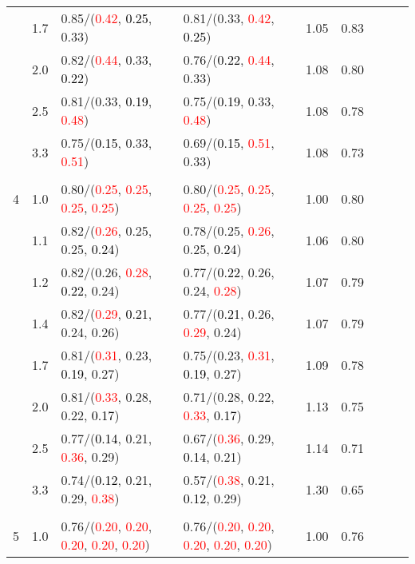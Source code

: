 \documentclass[10pt,a4paper]{report}
\begin{document}
\begin{table}[!htbp]
\begin{center}
{\begin{tabular}{ccllccccc}
			&1.7&0.85/(\textcolor{red}{0.42}, \textcolor{black}{0.25}, 0.33)&0.81/(0.33, \textcolor{red}{0.42}, \textcolor{black}{0.25})&1.05&0.83\\
			&2.0&0.82/(\textcolor{red}{0.44}, 0.33, \textcolor{black}{0.22})&0.76/(\textcolor{black}{0.22}, \textcolor{red}{0.44}, 0.33)&1.08&0.80\\
			&2.5&0.81/(0.33, \textcolor{black}{0.19}, \textcolor{red}{0.48})&0.75/(\textcolor{black}{0.19}, 0.33, \textcolor{red}{0.48})&1.08&0.78\\
			&3.3&0.75/(\textcolor{black}{0.15}, 0.33, \textcolor{red}{0.51})&0.69/(\textcolor{black}{0.15}, \textcolor{red}{0.51}, 0.33)&1.08&0.73\\
			&&&&\\
			4			&1.0&0.80/(\textcolor{red}{0.25}, \textcolor{red}{0.25}, \textcolor{red}{0.25}, \textcolor{red}{0.25})&0.80/(\textcolor{red}{0.25}, \textcolor{red}{0.25}, \textcolor{red}{0.25}, \textcolor{red}{0.25})&1.00&0.80\\
			&1.1&0.82/(\textcolor{red}{0.26}, 0.25, 0.25, \textcolor{black}{0.24})&0.78/(0.25, \textcolor{red}{0.26}, 0.25, \textcolor{black}{0.24})&1.06&0.80\\
			&1.2&0.82/(0.26, \textcolor{red}{0.28}, \textcolor{black}{0.22}, 0.24)&0.77/(\textcolor{black}{0.22}, 0.26, 0.24, \textcolor{red}{0.28})&1.07&0.79\\
			&1.4&0.82/(\textcolor{red}{0.29}, \textcolor{black}{0.21}, 0.24, 0.26)&0.77/(\textcolor{black}{0.21}, 0.26, \textcolor{red}{0.29}, 0.24)&1.07&0.79\\
			&1.7&0.81/(\textcolor{red}{0.31}, 0.23, \textcolor{black}{0.19}, 0.27)&0.75/(0.23, \textcolor{red}{0.31}, \textcolor{black}{0.19}, 0.27)&1.09&0.78\\
			&2.0&0.81/(\textcolor{red}{0.33}, 0.28, 0.22, \textcolor{black}{0.17})&0.71/(0.28, 0.22, \textcolor{red}{0.33}, \textcolor{black}{0.17})&1.13&0.75\\
			&2.5&0.77/(\textcolor{black}{0.14}, 0.21, \textcolor{red}{0.36}, 0.29)&0.67/(\textcolor{red}{0.36}, 0.29, \textcolor{black}{0.14}, 0.21)&1.14&0.71\\
			&3.3&0.74/(\textcolor{black}{0.12}, 0.21, 0.29, \textcolor{red}{0.38})&0.57/(\textcolor{red}{0.38}, 0.21, \textcolor{black}{0.12}, 0.29)&1.30&0.65\\
			&&&&\\
			5			&1.0&0.76/(\textcolor{red}{0.20}, \textcolor{red}{0.20}, \textcolor{red}{0.20}, \textcolor{red}{0.20}, \textcolor{red}{0.20})&0.76/(\textcolor{red}{0.20}, \textcolor{red}{0.20}, \textcolor{red}{0.20}, \textcolor{red}{0.20}, \textcolor{red}{0.20})&1.00&0.76\\

\end{tabular}}
\end{center}
\end{table}
\end{document}
